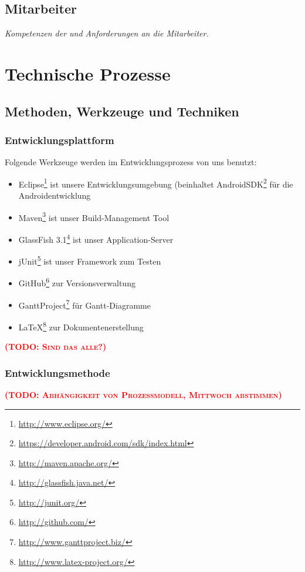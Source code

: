 \documentclass[fontsize=12pt,paper=a4,twoside]{scrartcl}
\newcommand{\todo}[1]{\textbf{\textsc{\textcolor{red}{(TODO: #1)}}}}
\begin{document}
\subsection{Mitarbeiter}
{\em Kompetenzen der und Anforderungen an die Mitarbeiter.}


\section{Technische Prozesse}
\subsection{Methoden, Werkzeuge und Techniken}
\subsubsection{Entwicklungsplattform}
Folgende Werkzeuge werden im Entwicklungsprozess von uns benutzt:
\begin{itemize}

\item{Eclipse\footnote{\url{http://www.eclipse.org/}} ist unsere Entwicklungsumgebung (beinhaltet AndroidSDK\footnote{\url{https://developer.android.com/sdk/index.html}} für die Androidentwicklung}
\item{Maven\footnote{\url{http://maven.apache.org/}} ist unser Build-Management Tool}
\item{GlassFish 3.1\footnote{\url{http://glassfish.java.net/}} ist unser Application-Server}
\item{jUnit\footnote{\url{http://junit.org/}} ist unser Framework zum Testen}
\item{GitHub\footnote{\url{http://github.com/}} zur Versionsverwaltung}
\item{GanttProject\footnote{\url{http://www.ganttproject.biz/}}} für Gantt-Diagramme
\item{\LaTeX{}\footnote{\url{http://www.latex-project.org/}}} zur Dokumentenerstellung

\end{itemize}
\todo{Sind das alle?}

\subsubsection{Entwicklungsmethode}

\todo{Abhängigkeit von Prozessmodell, Mittwoch abstimmen}
\end{document}
